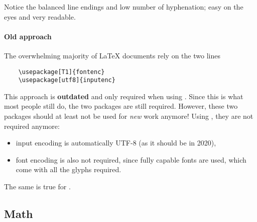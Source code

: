 Notice the balanced line endings and low number of hyphenation;
easy on the eyes and very readable.

\paragraph{Old approach}
The overwhelming majority of \LaTeX{} documents rely on the two lines
\begin{verbatim}
    \usepackage[T1]{fontenc}
    \usepackage[utf8]{inputenc}
\end{verbatim}
This approach is \textbf{outdated} and only required when using .
Since this is what most people still do, the two packages are still required.
However, these two packages should at least not be used for \emph{new} work anymore!
Using , they are not required anymore:
\begin{itemize}
    \item input encoding is automatically UTF-8 (as it should be in 2020),
    \item font encoding is also not required, since fully capable fonts are used,
        which come with all the glyphs required.
\end{itemize}
The same is true for .

\subsection{Math}

